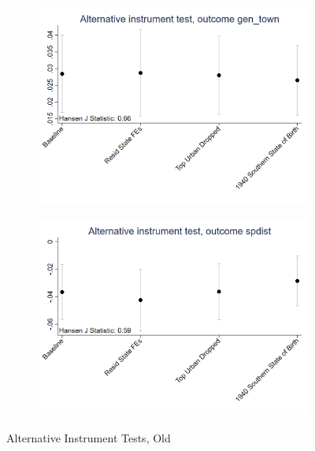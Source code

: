 \documentclass{article}
\begin{document}
\begin{figure}[htbp]
    \begin{subfigure}{0.3\textwidth}
        \includegraphics[width=\linewidth]{exhibits_old/figures/exogeneity_tests/D16_alt_inst_pooled_gen_town.png}
        \label{fig:sub4}
    \end{subfigure}
    \begin{subfigure}{0.3\textwidth}
        \includegraphics[width=\linewidth]{exhibits_old/figures/exogeneity_tests/D16_alt_inst_pooled_spdist.png}
        \label{fig:sub5}
    \end{subfigure}
    \caption{Alternative Instrument Tests, Old}
    \label{fig:all}
\end{figure}
\clearpage
\end{document}
